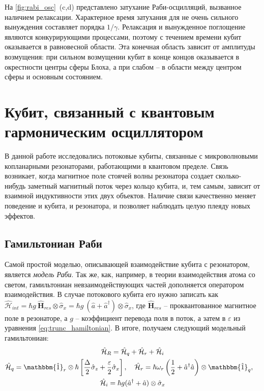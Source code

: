 \documentclass[12pt, twoside]{report}
\numberwithin{equation}{section}
\numberwithin{figure}{section}
\begin{document}
На \autoref{fig:rabi_osc}~(c,d) представлено затухание Раби-осцилляций, вызванное наличием релаксации. Характерное время затухания для не очень сильного вынуждения составляет порядка $1/\gamma$. Релаксация и вынужденное поглощение являются конкурирующими процессами, поэтому с течением времени кубит оказывается в равновесной области. Эта конечная область зависит от амплитуды возмущения: при сильном возмущении кубит в конце концов оказывается в окрестности центры сферы Блоха, а при слабом -- в области между центром сферы и основным состоянием.

\newpage

\section{Кубит, связанный с квантовым гармоническим осциллятором}

В данной работе исследовались потоковые кубиты, связанные с микроволновыми копланарными резонаторами, работающими в квантовом пределе. Связь возникает, когда магнитное поле стоячей волны резонатора создает сколько-нибудь заметный магнитный поток через кольцо кубита, и, тем самым, зависит от взаимной индуктивности этих двух объектов. Наличие связи качественно меняет поведение и кубита, и резонатора, и позволяет наблюдать целую плеяду новых эффектов.

\subsection{Гамильтониан Раби}

Самой простой моделью, описывающей взаимодействие кубита с резонатором, является \textit{модель Раби}. Так же, как, например, в теории взаимодействия атома со светом, гамильтониан невзаимодействующих частей дополняется оператором взаимодействия. В случае потокового кубита его нужно записать как $\mathcal{\hat H}_{int} = \hbar g\ \mathbf{\hat H}_{res} \otimes \hat \sigma_x = \hbar g\ (\hat a + \hat a^{\dag})\otimes \hat \sigma_x$, где $\mathbf{\hat H}_{res}$ -- проквантованное магнитное поле в резонаторе, а $g$ -- коэффициент перевода поля в поток, а затем в $\varepsilon$ из уравнения \eqref{eq:trunc_hamiltonian}. В итоге, получаем следующий модельный гамильтониан:
\begin{equation}
\begin{gathered}
	\mathcal{\hat H}_R = \hat{\mathcal{H}}_{q}+\hat{\mathcal{H}}_{r}+\hat{\mathcal{H}}_{i} \\
	\hat{\mathcal{H}}_{q} = \mathbbm{\hat 1}_r \otimes \hbar\left[\frac{\Delta}{2} \hat \sigma_z + 				\frac{\varepsilon}{2} \hat \sigma_x \right], \quad
	\hat{\mathcal{H}}_{r} = \hbar \omega_r \left(\frac{1}{2}+\hat a^\dag \hat a \right) \otimes \mathbbm{\hat 1}_q, \quad \\
	\hat{\mathcal{H}}_i = \hbar g (\hat a^\dag + \hat a) \otimes \hat \sigma_x
\end{gathered}
\label{eq:rabi_hamiltonian}
\end{equation}
\end{document}
